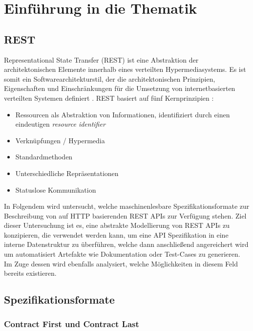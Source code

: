 
\section{Einführung in die Thematik}

\subsection{REST}

Representational State Transfer (REST) ist eine Abstraktion der architektonischen Elemente innerhalb eines verteilten Hypermediasystems. Es ist somit ein Softwarearchitekturstil, der die architektonischen Prinzipien, Eigenschaften und Einschränkungen für die Umsetzung von internetbasierten verteilten Systemen definiert \parencite[86]{fielding2000architectural}. REST basiert auf fünf Kernprinzipien \parencite[11]{tilkov2015rest}:
\begin{itemize}
	\item Ressourcen als Abstraktion von Informationen, identifiziert durch einen eindeutigen \emph{resource identifier}
	\item Verknüpfungen / Hypermedia
	\item Standardmethoden
	\item Unterschiedliche Repräsentationen
	\item Statuslose Kommunikation
\end{itemize}

In Folgendem wird untersucht, welche maschinenlesbare Spezifikationsformate zur Beschreibung von auf HTTP basierenden REST APIs zur Verfügung stehen. Ziel dieser Untersuchung ist es, eine abstrakte Modellierung von REST APIs zu konzipieren, die verwendet werden kann, um eine API Spezifikation in eine interne Datenstruktur zu überführen, welche dann anschließend angereichert wird um automatisiert Artefakte wie Dokumentation oder Test-Cases zu generieren. Im Zuge dessen wird ebenfalls analysiert, welche Möglichkeiten in diesem Feld bereits existieren.

\subsection{Spezifikationsformate}

\subsubsection{Contract First und Contract Last}

